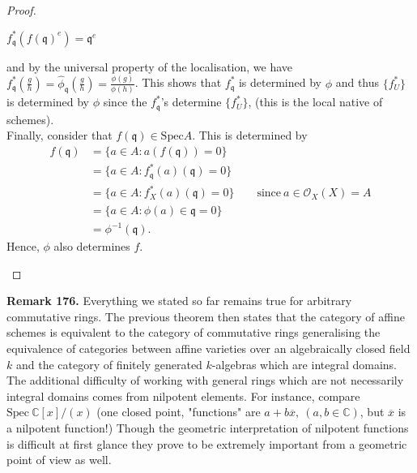 \documentclass[12pt,a4paper,footinclude=true,headinclude=true]{scrbook} %
\newenvironment{remark}[2][Remark]
    { \begin{mdframed}[backgroundcolor=gray!20] \textbf{#1 #2.} }
    {  \end{mdframed}}
\begin{document}
\begin{proof}
\begin{itemize}
\begin{center}
\qquad $f_{\mathfrak{q}}^\ast(f(\mathfrak{q})^e)=\mathfrak{q}^e$
        \end{center}
        and by the universal property of  the localisation, we have $f_\mathfrak{q}^\ast(\frac{g}{h})=\hat{\phi}_\mathfrak{q}(\frac{g}{h})=\frac{\phi(g)}{\phi(h)}$. This shows that $f_\mathfrak{q}^\ast$ is determined by $\phi$ and thus $\{f_U^\ast\}$ is determined by $\phi$ since the $f_\mathfrak{q}^\ast$'s determine $\{f_U^\ast\}$, (this is the local native of schemes). \\
        Finally, consider that $f(\mathfrak{q})\in\mathrm{Spec}A$. This is determined by 
        \begin{align*}
            f(\mathfrak{q}) &=\{a\in A:a(f(\mathfrak{q}))=0\} \\
            &=\{a\in A:f_\mathfrak{q}^\ast(a)(\mathfrak{q})=0\} \\
            &=\{a\in A:f_X^\ast(a)(\mathfrak{q})=0\} \qquad\text{since}\ a\in\mathcal{O}_X(X)=A \\
            &=\{a\in A:\phi(a)\in\mathfrak{q}=0\} \\ &=\phi^{-1}(\mathfrak{q}).
        \end{align*}
        Hence, $\phi$ also determines $f$.
    \end{itemize}
\end{proof}

\begin{remark}{176}
    Everything we stated so far remains true for arbitrary commutative rings. The previous theorem then states that the category of affine schemes is equivalent to the category of commutative rings generalising the equivalence of categories between affine varieties over an algebraically closed field $k$ and the category of finitely generated $k$-algebras which are integral domains.\\ The additional difficulty of working with general rings which are not necessarily integral domains comes from nilpotent elements. For instance, compare $\mathrm{Spec}\ \mathbb{C}[x]/(x)$ (one closed point, "functions" are $a+b\overline{x},\ (a,b\in\mathbb{C})$, but $\overline{x}$ is a nilpotent function!) Though the geometric interpretation of nilpotent functions is difficult at first glance they prove to be extremely important from a geometric point of view as well.
\end{remark}
\end{document}
